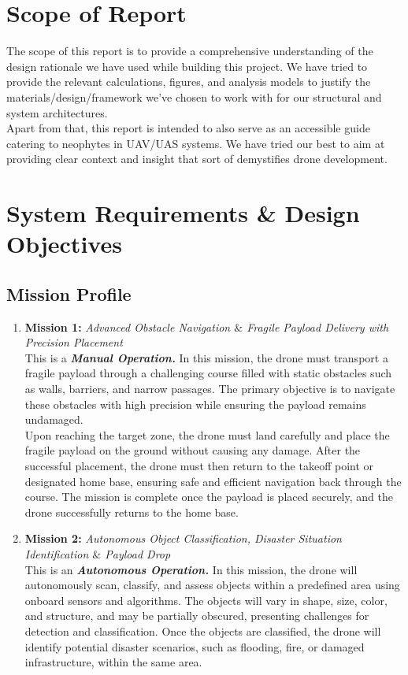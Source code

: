 \documentclass[12pt]{report}
\begin{document}
    \section{Scope of Report}
    The scope of this report is to provide a comprehensive understanding of the design rationale we have used while building this project. We have tried to provide the relevant calculations, figures, and analysis models to justify the materials/design/framework we've chosen to work with for our structural and system architectures. \\ 

    \noindent Apart from that, this report is intended to also serve as an accessible guide catering to neophytes in UAV/UAS systems. We have tried our best to aim at providing clear context and insight that sort of demystifies drone development.

  \section{System Requirements \& Design Objectives}
    \subsection{Mission Profile}
    \begin{enumerate}
      \item \textbf{Mission 1:} \textit{Advanced Obstacle Navigation $\&$ Fragile Payload Delivery with Precision Placement} \\
        This is a \textbf{\textit{Manual Operation.}} In this mission, the drone must transport a fragile payload through a challenging course filled with static obstacles such as walls, barriers, and narrow passages. The primary objective is to navigate these obstacles with high precision while ensuring the payload remains undamaged. \\
        
        Upon reaching the target zone, the drone must land carefully and place the fragile payload on the ground without causing any damage. After the successful placement, the drone must then return to the takeoff point or designated home base, ensuring safe and efficient navigation back through the course. The mission is complete once the payload is placed securely, and the drone successfully returns to the home base.
      \item \textbf{Mission 2:} \textit{Autonomous Object Classification, Disaster Situation Identification $\&$ Payload Drop }\\
        This is an \textbf{\textit{Autonomous Operation.}} In this mission, the drone will autonomously scan, classify, and assess objects within a predefined area using onboard sensors and algorithms. The objects will vary in shape, size, color, and structure, and may be partially obscured, presenting challenges for detection and classification. Once the objects are classified, the drone will identify potential disaster scenarios, such as flooding, fire, or damaged infrastructure, within the same area.
    \end{enumerate}
\end{document}
